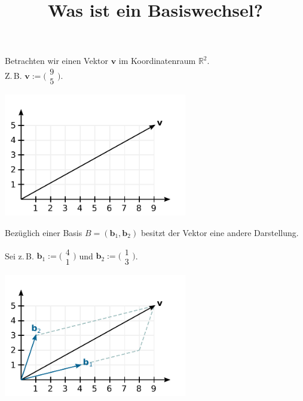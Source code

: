 \documentclass{beamer}
\title{Was ist ein Basiswechsel?}
\date{}
\newcommand{\bv}[1]{\mathbf{#1}}
\newcommand{\R}{\mathbb R}
\newcommand{\icol}[1]{
  \big(\!\begin{smallmatrix}#1\end{smallmatrix}\!\big)%
}
\begin{document}
\begin{frame}
\maketitle
\end{frame}

\begin{frame}[t]
\vspace{2em}
Betrachten wir einen Vektor $\bv v$ im Koordinatenraum $\R^2$.\\
Z.\,B. $\bv v:=\icol{9\\ 5}$.\pause

\vspace{-1.6em}
\begin{center}
\includegraphics[width=80mm]{img/Vektor.pdf}
\end{center}
\end{frame}

\begin{frame}[t]
\vspace{1em}
Bezüglich einer Basis $B=(\bv b_1,\bv b_2)$ besitzt der
Vektor eine andere Darstellung.\pause

\vspace{0.8em}
Sei z.\,B. $\bv b_1 := \icol{4\\ 1}$ und $\bv b_2 := \icol{1\\ 3}$.%
\pause

\vspace{-1.6em}
\begin{center}
\includegraphics[width=80mm]{img/Vektor-in-Basis-B.pdf}
\end{center}
\end{frame}
\end{document}
